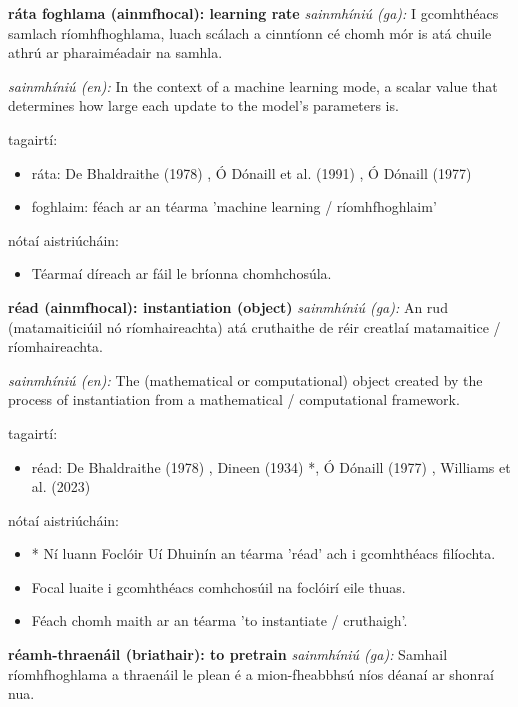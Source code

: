 \documentclass{article}
\begin{document}
\textbf{ráta foghlama (ainmfhocal): learning rate}
\textit{sainmhíniú (ga):} I gcomhthéacs samlach ríomhfhoghlama, luach scálach a cinntíonn cé chomh mór is atá chuile athrú ar pharaiméadair na samhla.

\textit{sainmhíniú (en):} In the context of a machine learning mode, a scalar value that determines how large each update to the model's parameters is.

tagairtí:
\begin{itemize}
	\item ráta: De Bhaldraithe (1978) \cite{de-bhaldraithe}, Ó Dónaill et al. (1991) \cite{focloir-beag}, Ó Dónaill (1977) \cite{odonaill}
	\item foghlaim: féach ar an téarma 'machine learning / ríomhfhoghlaim'
\end{itemize}

nótaí aistriúcháin:
\begin{itemize}
	\item Téarmaí díreach ar fáil le bríonna chomhchosúla.
\end{itemize}


\textbf{réad (ainmfhocal): instantiation (object)}
\textit{sainmhíniú (ga):} An rud (matamaiticiúil nó ríomhaireachta) atá cruthaithe de réir creatlaí matamaitice / ríomhaireachta.

\textit{sainmhíniú (en):} The (mathematical or computational) object created by the process of instantiation from a mathematical / computational framework.

tagairtí:
\begin{itemize}
	\item réad: De Bhaldraithe (1978) \cite{de-bhaldraithe}, Dineen (1934) \cite{dineen}*, Ó Dónaill (1977) \cite{odonaill}, Williams et al. (2023) \cite{storchiste}
\end{itemize}

nótaí aistriúcháin:
\begin{itemize}
	\item * Ní luann Foclóir Uí Dhuinín an téarma 'réad' ach i gcomhthéacs filíochta.
	\item Focal luaite i gcomhthéacs comhchosúil na foclóirí eile thuas.
	\item Féach chomh maith ar an téarma 'to instantiate / cruthaigh'.
\end{itemize}


\textbf{réamh-thraenáil (briathair): to pretrain}
\textit{sainmhíniú (ga):} Samhail ríomhfhoghlama a thraenáil le plean é a mion-fheabbhsú níos déanaí ar shonraí nua.
\end{document}
